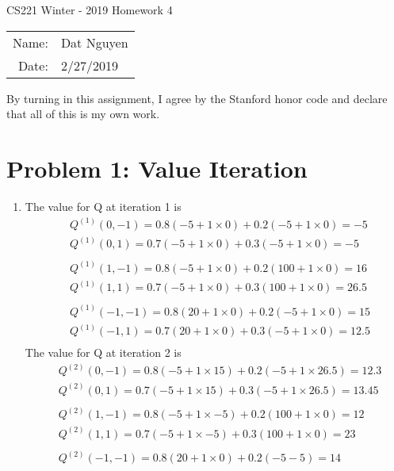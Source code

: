 \documentclass[12pt]{article}
\begin{document}
\begin{center}
{\Large CS221 Winter - 2019 Homework 4}

\begin{tabular}{rl}     
Name: & Dat Nguyen \\
Date: & 2/27/2019
\end{tabular}
\end{center}
 
 By turning in this assignment, I agree by the Stanford honor code and declare
that all of this is my own work.

\section*{Problem 1: Value Iteration}
\begin{enumerate}[label=(\alph*)]
    \item
    The value for Q at iteration 1 is
    \begin{align*}
    &Q^{(1)}(0, -1) = 0.8 (-5 + 1 \times 0) + 0.2(-5 + 1 \times 0) = -5 \\
    &Q^{(1)}(0, 1) = 0.7 (-5 + 1 \times 0) + 0.3(-5 + 1 \times 0) = -5 \\\\
    &Q^{(1)}(1, -1) = 0.8 (-5 + 1 \times 0) + 0.2(100 + 1 \times 0) = 16 \\
    &Q^{(1)}(1, 1) = 0.7 (-5 + 1 \times 0) + 0.3(100 + 1 \times 0) = 26.5 \\\\
    &Q^{(1)}(-1, -1) = 0.8 (20 + 1 \times 0) + 0.2(-5 + 1 \times 0) = 15 \\
    &Q^{(1)}(-1, 1) = 0.7 (20 + 1 \times 0) + 0.3(-5 + 1 \times 0) = 12.5 \\
    \end{align*}
    The value for Q at iteration 2 is
    \begin{align*}
    &Q^{(2)}(0, -1) = 0.8 (-5 + 1 \times 15) + 0.2(-5 + 1 \times 26.5) = 12.3 \\
    &Q^{(2)}(0, 1) = 0.7 (-5 + 1 \times 15) + 0.3(-5 + 1 \times 26.5) = 13.45 \\\\
    &Q^{(2)}(1, -1) = 0.8 (-5 + 1 \times -5) + 0.2(100 + 1 \times 0) = 12 \\
    &Q^{(2)}(1, 1) = 0.7 (-5 + 1 \times -5) + 0.3(100 + 1 \times 0) = 23 \\\\
    &Q^{(2)}(-1, -1) = 0.8 (20 + 1 \times 0) + 0.2(-5 - 5) = 14 \\

\end{align*}
\end{enumerate}
\end{document}
